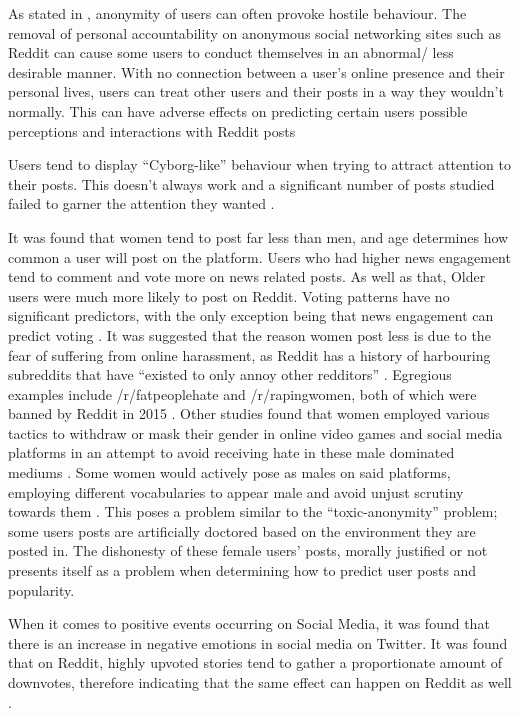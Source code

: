 As stated in \cite{13}, anonymity of users can often provoke hostile behaviour. The removal of personal accountability on anonymous social networking sites such as Reddit can cause some users to conduct themselves in an abnormal/ less desirable manner.  With no connection between a user’s online presence and their personal lives, users can treat other users and their posts in a way they wouldn’t normally. This can have adverse effects on predicting certain users possible perceptions and interactions with Reddit posts

Users tend to display “Cyborg-like” behaviour when trying to attract attention to their posts. This doesn’t always work and a significant number of posts studied failed to garner the attention they wanted \cite{7}. 

It was found that women tend to post far less than men, and age determines how common a user will post on the platform. Users who had higher news engagement tend to comment and vote more on news related posts. As well as that, Older users were much more likely to post on Reddit. Voting patterns have no significant predictors, with the only exception being that news engagement can predict voting \cite{1}. It was suggested that the reason women post less is due to the fear of suffering from online harassment, as Reddit has a history of harbouring subreddits that have “existed to only annoy other redditors” \cite{1} \cite{4}. Egregious examples include /r/fatpeoplehate and /r/rapingwomen, both of which were banned by Reddit in 2015 \cite{4}. Other studies found that women employed various tactics to withdraw or mask their gender in online video games and social media platforms in an attempt to avoid receiving hate in these male dominated mediums \cite{1}\cite{15}. Some women would actively pose as males on said platforms, employing different vocabularies to appear male and avoid unjust scrutiny towards them \cite{15}. This poses a problem similar to the “toxic-anonymity” problem; some users posts are artificially doctored based on the environment they are posted in. The dishonesty of these female users’ posts, morally justified or not presents itself as a problem when determining how to predict user posts and popularity.

When it comes to positive events occurring on Social Media, it was found that there is an increase in negative emotions in social media on Twitter. It was found that on Reddit, highly upvoted stories tend to gather a proportionate amount of downvotes, therefore indicating that the same effect can happen on Reddit as well \cite{3}.

